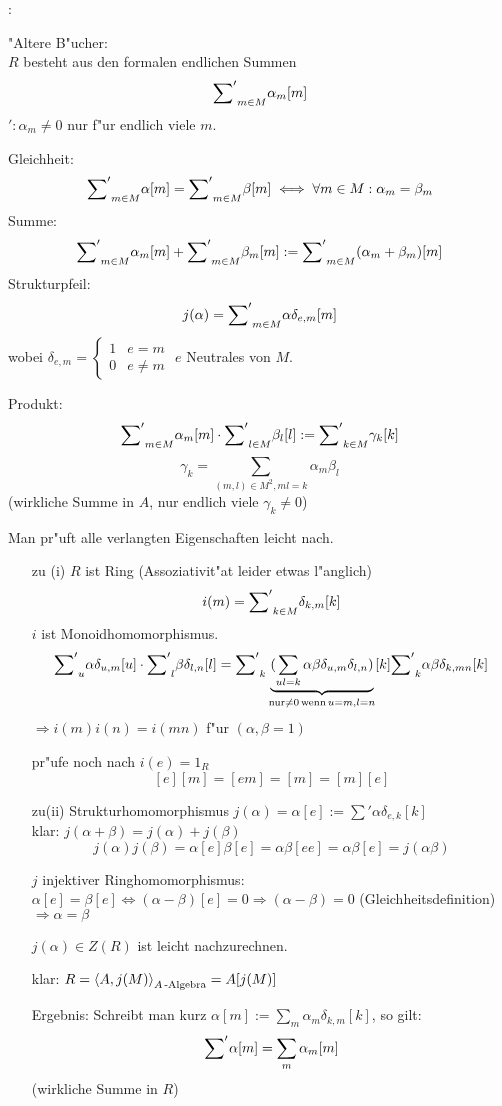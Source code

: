 \deduction{}:{
 "Altere B"ucher: \\
 $R$ besteht aus den formalen endlichen Summen
 \[ {\sum\nolimits'}_{m\in M}   \alpha_m[m] \] \hfill $':\alpha_m \neq 0$ nur f"ur endlich viele $m$.
 
 Gleichheit: \[{\sum\nolimits'}_{m\in M}\alpha[m] = {\sum\nolimits'}_{m\in M}\beta[m] \iff \forall m\in M : \alpha_m =\beta_m\]
 Summe: \[ {\sum\nolimits'}_{m\in M}\alpha_m[m]+{\sum\nolimits'}_{m\in M}\beta_m[m]:= {\sum\nolimits'}_{m\in M}(\alpha_m+\beta_m)[m]\]
 Strukturpfeil: \[j(\alpha)={\sum\nolimits'}_{m\in M}\alpha \delta_{e,m}[m] \] wobei
 $\delta_{e,m}=\begin{cases}
               1 & e=m\\
			   0 & e\neq m
			  \end{cases}$	
\hfill $e$ Neutrales von $M$.

Produkt: \[ {\sum\nolimits'}_{m\in M}\alpha_m[m]\cdot {\sum\nolimits'}_{l\in M}\beta_l[l]:={\sum\nolimits'}_{k\in M}\gamma_k[k]\]
\[\gamma_k=\sum_{(m,l)\in M^2,ml=k}\alpha_m\beta_l\] \hfill 
(wirkliche Summe in $A$, nur endlich viele $\gamma_k \neq 0$)

Man pr"uft alle verlangten Eigenschaften leicht nach.
\begin{enumerate}
\item[zu (i)] $R$ ist Ring (Assoziativit"at leider etwas l"anglich)\\
\[i(m)={\sum\nolimits'}_{k\in M} \delta_{k,m}[k]\]
$i$ ist Monoidhomomorphismus.
\[{\sum\nolimits'}_{u}\alpha \delta_{u,m}[u]\cdot {\sum\nolimits'}_{l}\beta \delta_{l,n}[l]={\sum\nolimits'}_{k} \underbrace{(\sum_{ul=k}
\alpha \beta \delta_{u,m}\delta_{l,n})}_{\operatorname{nur}\neq 0 \operatorname{wenn} u=m,l=n}[k]
{\sum\nolimits'}_{k}\alpha \beta \delta_{k,mn}[k]\]
$\Rightarrow i(m)i(n)=i(mn)$ f"ur $(\alpha,\beta =1)$

pr"ufe noch nach $i(e)=1_R$
\[[e][m]=[em]=[m]=[m][e]\]
\item[zu(ii)] Strukturhomomorphismus $j(\alpha)=\alpha[e]:=\sum ' \alpha \delta_{e,k}[k]$\\
klar: $j(\alpha + \beta)=j(\alpha)+j(\beta)$
\[j(\alpha)j(\beta)=\alpha[e]\beta[e]=\alpha \beta[ee]= \alpha \beta[e]=j(\alpha \beta)\]

$j$ injektiver Ringhomomorphismus:
$\alpha[e]=\beta[e] \iff (\alpha-\beta)[e]=0 \Rightarrow (\alpha-\beta)=0$ (Gleichheitsdefinition)
$\Rightarrow \alpha = \beta$

$j(\alpha)\in Z(R)$ ist leicht nachzurechnen.

klar: $R={\left\langle A,j(M)\right\rangle}_{A \operatorname{-Algebra}}=A[j(M)]$

Ergebnis: Schreibt man kurz $\alpha[m]:=\sum_{m}\alpha_m \delta_{k,m}[k]$, so gilt:
\[{\sum\nolimits'}_{}\alpha[m] = \sum_{m}\alpha_m[m]\]
(wirkliche Summe in $R$)
\end{enumerate}			  
}
